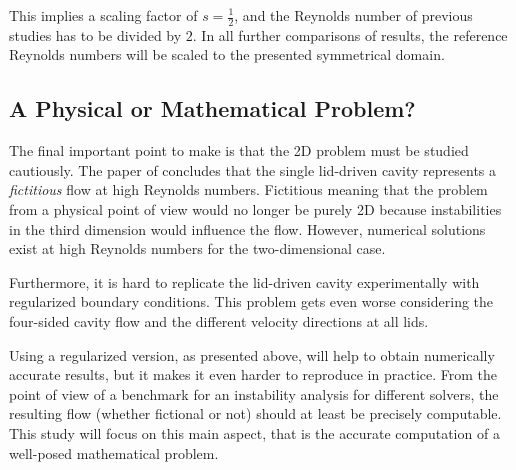 This implies a scaling factor of $s=\frac{1}{2}$, and the Reynolds number of
previous studies has to be divided by $2$. In all further comparisons of
results, the reference Reynolds numbers will be scaled to the presented
symmetrical domain.

\subsection{A Physical or Mathematical Problem?}

The final important point to make is that the 2D problem must be studied
cautiously. The paper of \cite{eturk2009} concludes that the single lid-driven
cavity represents a \emph{fictitious} flow at high Reynolds numbers. Fictitious
meaning that the problem from a physical point of view would no longer be
purely 2D because instabilities in the third dimension would influence the
flow. However, numerical solutions exist at high Reynolds numbers for the
two-dimensional case.

Furthermore, it is hard to replicate the lid-driven cavity experimentally with
regularized boundary conditions. This problem gets even worse considering the
four-sided cavity flow and the different velocity directions at all lids.

Using a regularized version, as presented above, will help to obtain
numerically accurate results, but it makes it even harder to reproduce in
practice. From the point of view of a benchmark for an instability analysis for
different solvers, the resulting flow (whether fictional or not) should at
least be precisely computable. This study will focus on this main aspect, that
is the accurate computation of a well-posed mathematical problem. 
